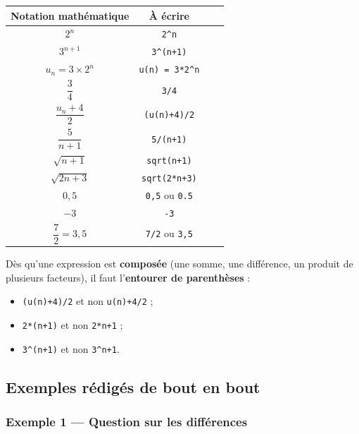 \documentclass[11pt,a4paper]{article}
\begin{document}
\begin{center}
\renewcommand{\arraystretch}{1.35}
\begin{tabular}{cc>{\ttfamily}cc}
\toprule
\textbf{Notation mathématique} & \textbf{À écrire} \\
\midrule
\(2^n\)                     & \verb|2^n| \\
\(3^{n+1}\)                 & \verb|3^(n+1)| \\
\(u_n = 3 \times 2^n\)      & \verb|u(n) = 3*2^n| \\
\(\dfrac{3}{4}\)            & \verb|3/4| \\
\(\dfrac{u_n + 4}{2}\)      & \verb|(u(n)+4)/2| \\
\(\dfrac{5}{n+1}\)          & \verb|5/(n+1)| \\
\(\sqrt{n+1}\)              & \verb|sqrt(n+1)| \\
\(\sqrt{2n+3}\)             & \verb|sqrt(2*n+3)| \\
\(0{,}5\)                   & \verb|0,5| ou \verb|0.5| \\
\(-3\)                      & \verb|-3| \\
\(\dfrac{7}{2} = 3{,}5\)    & \verb|7/2| ou \verb|3,5| \\
\bottomrule
\end{tabular}
\end{center}

\begin{astuce}
Dès qu'une expression est \textbf{composée} (une somme, une différence, un produit
de plusieurs facteurs), il faut l'\textbf{entourer de parenthèses} :
\begin{itemize}
  \item \verb|(u(n)+4)/2| et non \verb|u(n)+4/2| ;
  \item \verb|2*(n+1)| et non \verb|2*n+1| ;
  \item \verb|3^(n+1)| et non \verb|3^n+1|.
\end{itemize}
\end{astuce}

\subsection{Exemples rédigés de bout en bout}

\subsubsection*{Exemple 1 — Question sur les différences}
\end{document}
